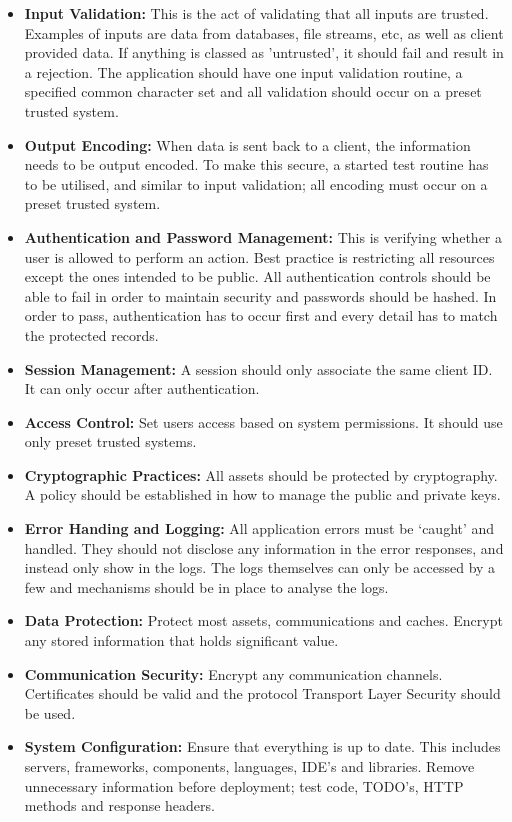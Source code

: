 \begin{itemize}
\item \textbf{Input Validation:} This is the act of validating that all inputs are trusted. Examples of inputs are data from databases, file streams, etc, as well as client provided data. If anything is classed as 'untrusted', it should fail and result in a rejection. The application should have one input validation routine, a specified common character set and all validation should occur on a preset trusted system. 
\item \textbf{Output Encoding:} When data is sent back to a client, the information needs to be output encoded. To make this secure, a started test routine has to be utilised, and similar to input validation; all encoding must occur on a preset trusted system. 
\item \textbf{Authentication and Password Management:} This is verifying whether a user is allowed to perform an action. Best practice is restricting all resources except the ones intended to be public. All authentication controls should be able to fail in order to maintain security and passwords should be hashed.  In order to pass, authentication has to occur first and every detail has to match the protected records. 
\item \textbf{Session Management:} A session should only associate the same client ID. It can only occur after authentication. 
\item \textbf{Access Control:} Set users access based on system permissions. It should use only preset trusted systems. 
\item \textbf{Cryptographic Practices:} All assets should be protected by cryptography. A policy should be established in how to manage the public and private keys. 
\item \textbf{Error Handing and Logging:} All application errors must be ‘caught’ and handled. They should not disclose any information in the error responses, and instead only show in the logs. The logs themselves can only be accessed by a few and mechanisms should be in place to analyse the logs. 
\item \textbf{Data Protection:} Protect most assets, communications and caches. Encrypt any stored information that holds significant value. 
\item \textbf{Communication Security:} Encrypt any communication channels. Certificates should be valid and the protocol Transport Layer Security should be used. 
\item \textbf{System Configuration:} Ensure that everything is up to date. This includes servers, frameworks, components, languages, IDE's and libraries. Remove unnecessary information before deployment; test code, TODO's, HTTP methods and response headers. 

\end{itemize}
